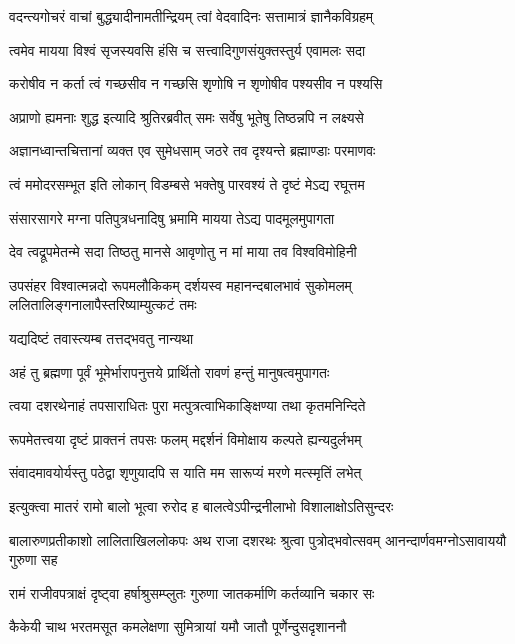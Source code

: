 \twolineshloka
{वदन्त्यगोचरं वाचां बुद्ध्यादीनामतीन्द्रियम्}
{त्वां वेदवादिनः सत्तामात्रं ज्ञानैकविग्रहम्} %

\twolineshloka
{त्वमेव मायया विश्वं सृजस्यवसि हंसि च}
{सत्त्वादिगुणसंयुक्तस्तुर्य एवामलः सदा} %

\twolineshloka
{करोषीव न कर्ता त्वं गच्छसीव न गच्छसि}
{शृणोषि न शृणोषीव पश्यसीव न पश्यसि} %

\twolineshloka
{अप्राणो ह्यमनाः शुद्ध इत्यादि श्रुतिरब्रवीत्}
{समः सर्वेषु भूतेषु तिष्ठन्नपि न लक्ष्यसे} %

\twolineshloka
{अज्ञानध्वान्तचित्तानां व्यक्त एव सुमेधसाम्}
{जठरे तव दृश्यन्ते ब्रह्माण्डाः परमाणवः} %

\twolineshloka
{त्वं ममोदरसम्भूत इति लोकान् विडम्बसे}
{भक्तेषु पारवश्यं ते दृष्टं मेऽद्य रघूत्तम} %

\twolineshloka
{संसारसागरे मग्ना पतिपुत्रधनादिषु}
{भ्रमामि मायया तेऽद्य पादमूलमुपागता} %

\twolineshloka
{देव त्वद्रूपमेतन्मे सदा तिष्ठतु मानसे}
{आवृणोतु न मां माया तव विश्वविमोहिनी} %

\threelineshloka
{उपसंहर विश्वात्मन्नदो रूपमलौकिकम्}
{दर्शयस्व महानन्दबालभावं सुकोमलम्}
{ललितालिङ्गनालापैस्तरिष्याम्युत्कटं तमः} %


\onelineshloka
{यद्यदिष्टं तवास्त्यम्ब तत्तद्भवतु नान्यथा} %

\twolineshloka
{अहं तु ब्रह्मणा पूर्वं भूमेर्भारापनुत्तये}
{प्रार्थितो रावणं हन्तुं मानुषत्वमुपागतः} %

\twolineshloka
{त्वया दशरथेनाहं तपसाराधितः पुरा}
{मत्पुत्रत्वाभिकाङ्क्षिण्या तथा कृतमनिन्दिते} %

\twolineshloka
{रूपमेतत्त्वया दृष्टं प्राक्तनं तपसः फलम्}
{मद्दर्शनं विमोक्षाय कल्पते ह्यन्यदुर्लभम्} %

\twolineshloka
{संवादमावयोर्यस्तु पठेद्वा शृणुयादपि}
{स याति मम सारूप्यं मरणे मत्स्मृतिं लभेत्} %

\twolineshloka
{इत्युक्त्वा मातरं रामो बालो भूत्वा रुरोद ह}
{बालत्वेऽपीन्द्रनीलाभो विशालाक्षोऽतिसुन्दरः} %

\threelineshloka
{बालारुणप्रतीकाशो लालिताखिललोकपः}
{अथ राजा दशरथः श्रुत्वा पुत्रोद्भवोत्सवम्}
{आनन्दार्णवमग्नोऽसावाययौ गुरुणा सह} %

\twolineshloka
{रामं राजीवपत्राक्षं दृष्ट्वा हर्षाश्रुसम्प्लुतः}
{गुरुणा जातकर्माणि कर्तव्यानि चकार सः} %

\twolineshloka
{कैकेयी चाथ भरतमसूत कमलेक्षणा}
{सुमित्रायां यमौ जातौ पूर्णेन्दुसदृशाननौ} %

